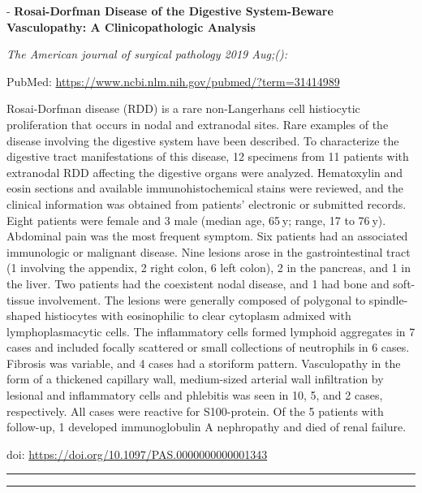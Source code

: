 \documentclass[]{article}
\begin{document}
 - \textbf{Rosai-Dorfman Disease of the Digestive System-Beware
Vasculopathy: A Clinicopathologic Analysis}

\emph{The American journal of surgical pathology 2019 Aug;():}

PubMed: \url{https://www.ncbi.nlm.nih.gov/pubmed/?term=31414989}

Rosai-Dorfman disease (RDD) is a rare non-Langerhans cell histiocytic
proliferation that occurs in nodal and extranodal sites. Rare examples
of the disease involving the digestive system have been described. To
characterize the digestive tract manifestations of this disease, 12
specimens from 11 patients with extranodal RDD affecting the digestive
organs were analyzed. Hematoxylin and eosin sections and available
immunohistochemical stains were reviewed, and the clinical information
was obtained from patients' electronic or submitted records. Eight
patients were female and 3 male (median age, 65 y; range, 17 to 76 y).
Abdominal pain was the most frequent symptom. Six patients had an
associated immunologic or malignant disease. Nine lesions arose in the
gastrointestinal tract (1 involving the appendix, 2 right colon, 6 left
colon), 2 in the pancreas, and 1 in the liver. Two patients had the
coexistent nodal disease, and 1 had bone and soft-tissue involvement.
The lesions were generally composed of polygonal to spindle-shaped
histiocytes with eosinophilic to clear cytoplasm admixed with
lymphoplasmacytic cells. The inflammatory cells formed lymphoid
aggregates in 7 cases and included focally scattered or small
collections of neutrophils in 6 cases. Fibrosis was variable, and 4
cases had a storiform pattern. Vasculopathy in the form of a thickened
capillary wall, medium-sized arterial wall infiltration by lesional and
inflammatory cells and phlebitis was seen in 10, 5, and 2 cases,
respectively. All cases were reactive for S100-protein. Of the 5
patients with follow-up, 1 developed immunoglobulin A nephropathy and
died of renal failure.

doi: \url{https://doi.org/10.1097/PAS.0000000000001343}

{}

{}

\begin{center}\rule{0.5\linewidth}{\linethickness}\end{center}

\begin{center}\rule{0.5\linewidth}{\linethickness}\end{center}
\end{document}
